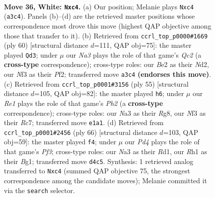 \documentclass[11pt]{article}
\begin{document}
\clearpage

\begin{figure}[p]\centering
\begin{subfigure}{0.46\textwidth}\centering
\resizebox{\linewidth}{!}{%
\newchessgame
\chessboard[
  setfen={rnb4r/1p4k1/3qp3/p1p2p1p/PnpP1P2/N4NP1/1P1QB1KP/4R2R w - - 0 36},
  showmover=false,
  pgfstyle=straightmove, color=movearrow, markmove={a3-c4}
]}
\caption{}
\end{subfigure}\hfill
\begin{subfigure}{0.46\textwidth}\centering
\resizebox{\linewidth}{!}{%
\newchessgame
\chessboard[
  setfen={4rbk1/r2b1p2/4nqpp/P1p1p3/1pB1P2P/5NP1/1PQN1PK1/R3R3 w - - 0 31},
  showmover=false,
  pgfstyle=straightmove, color=movearrow, markmove={c2-d3}
]}
\caption{}
\end{subfigure}
\\[4pt]
\begin{subfigure}{0.46\textwidth}\centering
\resizebox{\linewidth}{!}{%
\newchessgame
\chessboard[
  setfen={1k4r1/ppr1qp1p/2p1nn2/3p4/3P1P1p/PQN1P2B/1PR2P2/K1R5 b - - 2 28},
  showmover=false,
  pgfstyle=straightmove, color=movearrow, markmove={h7-h6}
]}
\caption{}
\end{subfigure}\hfill
\begin{subfigure}{0.46\textwidth}\centering
\resizebox{\linewidth}{!}{%
\newchessgame
\chessboard[
  setfen={5r2/3r2pk/1pqp2bp/p7/PnP1p3/1QR1NP1P/1P4PK/3R2B1 w - - 0 34},
  showmover=false,
  pgfstyle=straightmove, color=movearrow, markmove={f3-f4}
]}
\caption{}
\end{subfigure}
\caption{\textbf{Move 36, White: \texttt{Nxc4}.} (a) Our position; Melanie plays \texttt{Nxc4} (\texttt{a3c4}). Panels (b)--(d) are the retrieved master positions whose correspondence most drove this move (highest QAP objective among those that transfer to it). (b) Retrieved from \texttt{ccrl\_top\_p0000\#1669} (ply 60) [structural distance $d$=111, QAP obj=75]: the master played \texttt{Qd3}; under $\mu$ our \emph{Na3} plays the role of that game's \emph{Qc2} (a \textbf{cross-type} correspondence); cross-type roles: our \emph{B}e2 as their \emph{N}d2, our \emph{N}f3 as their \emph{P}f2; transferred move \texttt{a3c4} \textbf{(endorses this move)}. (c) Retrieved from \texttt{ccrl\_top\_p0001\#3156} (ply 55) [structural distance $d$=105, QAP obj=82]: the master played \texttt{h6}; under $\mu$ our \emph{Re1} plays the role of that game's \emph{Ph2} (a \textbf{cross-type} correspondence); cross-type roles: our \emph{N}a3 as their \emph{R}g8, our \emph{N}f3 as their \emph{R}c7; transferred move \texttt{e1a1}. (d) Retrieved from \texttt{ccrl\_top\_p0001\#2456} (ply 66) [structural distance $d$=103, QAP obj=59]: the master played \texttt{f4}; under $\mu$ our \emph{Pd4} plays the role of that game's \emph{Pf3}; cross-type roles: our \emph{N}a3 as their \emph{R}d1, our \emph{R}h1 as their \emph{B}g1; transferred move \texttt{d4c5}. Synthesis: 1 retrieved analog transferred to \texttt{Nxc4} (summed QAP objective 75, the strongest correspondence among the candidate moves); Melanie committed it via the \texttt{search} selector.}
\label{fig:thought-m70}
\end{figure}
\end{document}
